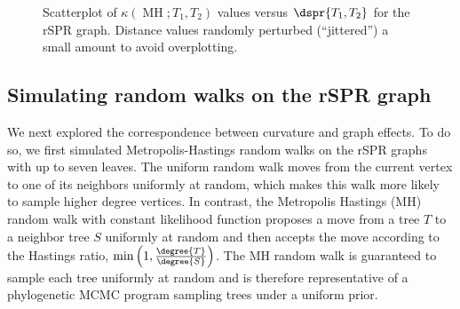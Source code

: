\documentclass[11pt,onecolumn,conference]{IEEEtran}
\let\MYoriglatexcaption\caption
\renewcommand{\caption}[2][\relax]{\MYoriglatexcaption[#2]{#2}}
\newcommand{\MH}{\operatorname{MH}}
\begin{document}
\begin{figure}
    \caption{Scatterplot of $\kappa(\MH; T_1,T_2)$ values versus $\dspr{T_1,T_2}$ for the rSPR graph. Distance values randomly perturbed (``jittered'') a small amount to avoid overplotting.}
	\label{fig:rspr-scatter}
\end{figure}

\subsection{Simulating random walks on the rSPR graph}
\label{sec:random_walks}
We next explored the correspondence between curvature and graph effects.
To do so, we first simulated Metropolis-Hastings random walks on the rSPR graphs with up to seven leaves.
The uniform random walk moves from the current vertex to one of its neighbors uniformly at random, which makes this walk more likely to sample higher degree vertices.
In contrast, the Metropolis Hastings (MH) random walk with constant likelihood function proposes a move from a tree $T$ to a neighbor tree $S$ uniformly at random and then accepts the move according to the Hastings ratio, $\min\left(1, \frac{\degree{T}}{\degree{S}}\right)$.
The MH random walk is guaranteed to sample each tree uniformly at random and is therefore representative of a phylogenetic MCMC program sampling trees under a uniform prior.
\end{document}
